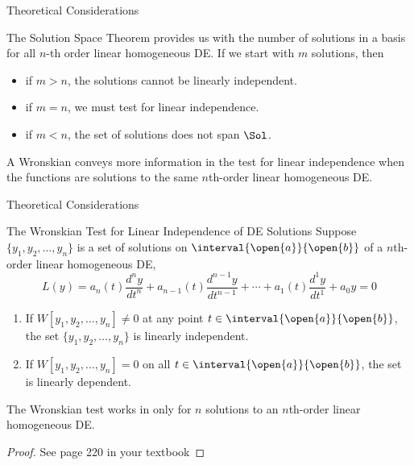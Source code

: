 \documentclass{beamer}
\begin{document}
\begin{frame}{Theoretical Considerations}
\begin{block}{}
The Solution Space Theorem provides us with the number of solutions in a basis for all $n$-th order linear homogeneous DE\@.
\onslide<+->
If we start with $m$ solutions, then
\begin{itemize}[<+- | alert@+>]
\item if $m>n$, the solutions cannot be linearly independent.
\item if $m=n$, we must test for linear independence.
\item if $m<n$, the set of solutions does not span $\Sol$.
\end{itemize}
\end{block}
\onslide<+->
\begin{block}{}
A Wronskian conveys more information in the test for linear independence when the functions are solutions to the same $n$th-order linear homogeneous DE\@.
\end{block}
\end{frame}

\newcommand{\custdiff}[1]{a_{#1} (t)\dfrac{d^{#1}y}{dt^{#1}}}
\begin{frame}{Theoretical Considerations}
\begin{block}{The Wronskian Test for Linear Independence of DE Solutions}
Suppose $\{y_1,y_2,\ldots,y_n\}$ is a set of solutions on $\interval{\open{a}}{\open{b}}$ of a $n$th-order linear homogeneous DE\@,
\begin{equation*}
L(y)=\custdiff{n}+\custdiff{n-1}+\cdots+\custdiff{1}+a_0y=0
\end{equation*}
\onslide<+->
\begin{enumerate}[<+- | alert@+>]
\item If $W[y_1,y_2,\ldots,y_n]\neq0$ at any point $t\in\interval{\open{a}}{\open{b}}$, the set $\{y_1,y_2,\ldots,y_n\}$ is linearly independent.
\item If $W[y_1,y_2,\ldots,y_n]=0$ on all $t\in\interval{\open{a}}{\open{b}}$, the set is linearly dependent.
\end{enumerate}
\onslide<+->
The Wronskian test works in  only for $n$ solutions to an $n$th-order linear homogeneous DE\@.
\end{block}
\onslide<+->
\begin{proof}
See page 220 in your textbook
\end{proof}
\end{frame}
\end{document}
